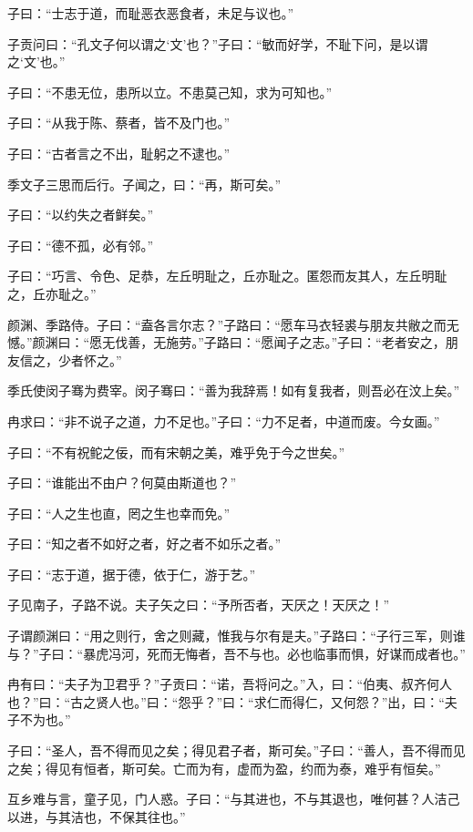 \documentclass[a5paper]{ctexbook}
\begin{document}
    子曰：“士志于道，而耻恶衣恶食者，未足与议也。”

    子贡问曰：“孔文子何以谓之‘文’也？”子曰：“敏而好学，不耻下问，是以谓之‘文’也。”

    子曰：“不患无位，患所以立。不患莫己知，求为可知也。”

    子曰：“从我于陈、蔡者，皆不及门也。”

    子曰：“古者言之不出，耻躬之不逮也。”

    季文子三思而后行。子闻之，曰：“再，斯可矣。”
    
    子曰：“以约失之者鲜矣。”

    子曰：“德不孤，必有邻。”

    子曰：“巧言、令色、足恭，左丘明耻之，丘亦耻之。匿怨而友其人，左丘明耻之，丘亦耻之。”

    颜渊、季路侍。子曰：“盍各言尔志？”子路曰：“愿车马衣轻裘与朋友共敝之而无憾。”颜渊曰：“愿无伐善，无施劳。”子路曰：“愿闻子之志。”子曰：“老者安之，朋友信之，少者怀之。”

    

    季氏使闵子骞为费宰。闵子骞曰：“善为我辞焉！如有复我者，则吾必在汶上矣。”

    冉求曰：“非不说子之道，力不足也。”子曰：“力不足者，中道而废。今女画。”

    子曰：“不有祝𬶍之佞，而有宋朝之美，难乎免于今之世矣。”

    子曰：“谁能出不由户？何莫由斯道也？”

    子曰：“人之生也直，罔之生也幸而免。”

    子曰：“知之者不如好之者，好之者不如乐之者。”

    

    子曰：“志于道，据于德，依于仁，游于艺。”

    

    子见南子，子路不说。夫子矢之曰：“予所否者，天厌之！天厌之！”

    子谓颜渊曰：“用之则行，舍之则藏，惟我与尔有是夫。”子路曰：“子行三军，则谁与？”子曰：“暴虎冯河，死而无悔者，吾不与也。必也临事而惧，好谋而成者也。”

    冉有曰：“夫子为卫君乎？”子贡曰：“诺，吾将问之。”入，曰：“伯夷、叔齐何人也？”曰：“古之贤人也。”曰：“怨乎？”曰：“求仁而得仁，又何怨？”出，曰：“夫子不为也。”

    子曰：“圣人，吾不得而见之矣；得见君子者，斯可矣。”子曰：“善人，吾不得而见之矣；得见有恒者，斯可矣。亡而为有，虚而为盈，约而为泰，难乎有恒矣。”

    互乡难与言，童子见，门人惑。子曰：“与其进也，不与其退也，唯何甚？人洁己以进，与其洁也，不保其往也。”
\end{document}
